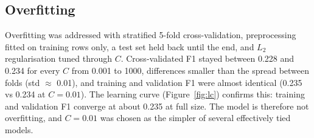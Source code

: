 \subsection*{Overfitting}
Overfitting was addressed with stratified 5-fold cross-validation, preprocessing fitted on training rows only, a test set held back until the end, and $L_2$ regularisation tuned through $C$.
Cross-validated F1 stayed between 0.228 and 0.234 for every $C$ from 0.001 to 1000, differences smaller than the spread between folds (std $\approx$ 0.01), and training and validation F1 were almost identical (0.235 vs 0.234 at $C=0.01$).
The learning curve (Figure~\ref{fig:lc}) confirms this: training and validation F1 converge at about 0.235 at full size.
The model is therefore not overfitting, and $C=0.01$ was chosen as the simpler of several effectively tied models.
